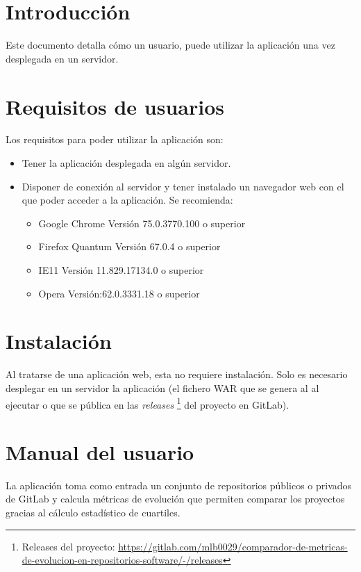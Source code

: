 \label{anex:D}

\section{Introducción}
Este documento detalla cómo un usuario, puede utilizar la aplicación una vez desplegada en un servidor.
\section{Requisitos de usuarios}
Los requisitos para poder utilizar la aplicación son:
\begin{itemize}
	\tightlist
	\item Tener la aplicación desplegada en algún servidor.
	\item Disponer de conexión al servidor y tener instalado un navegador web con el que poder acceder a la aplicación. Se recomienda:
	\begin{itemize}
		\tightlist
		\item Google Chrome Versión 75.0.3770.100 o superior
		\item Firefox Quantum Versión 67.0.4 o superior
		\item IE11 Versión 11.829.17134.0 o superior
		\item Opera Versión:62.0.3331.18 o superior
	\end{itemize}
\end{itemize}
\section{Instalación}
Al tratarse de una aplicación web, esta no requiere instalación. Solo es necesario desplegar en un servidor la aplicación (el fichero WAR  que se genera al al ejecutar  o que se pública en las \textit{releases} \footnote{Releases del proyecto: \url{https://gitlab.com/mlb0029/comparador-de-metricas-de-evolucion-en-repositorios-software/-/releases}} del proyecto en GitLab).

\section{Manual del usuario}

La aplicación toma como entrada un conjunto de repositorios públicos o privados de GitLab y calcula métricas de evolución que permiten comparar los proyectos gracias al cálculo estadístico de cuartiles.

